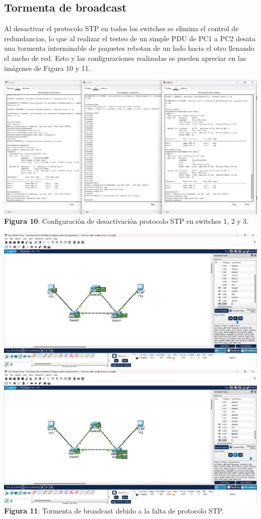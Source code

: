 \documentclass{article}
\begin{document}
    \subsection{Tormenta de broadcast}
    Al desactivar el protocolo STP en todos los switches se elimina el control de redundancias, lo que al realizar el testeo de un simple PDU de PC1 a PC2 desata una tormenta interminable de paquetes rebotan de un lado hacia el otro llenando el ancho de red. Esto y las configuraciones realizadas se pueden apreciar en las imágenes de Figura 10 y 11.
    \begin{center}
        \includegraphics[width=0.875\linewidth]{img_11} 
        \linebreak
        \small {\bfseries Figura 10}: Configuración de desactivación protocolo STP en switches 1, 2 y 3.
    \end{center}

    \begin{center}
        \includegraphics[width=0.475\linewidth]{img_13} 
        \includegraphics[width=0.475\linewidth]{img_14} 
        \linebreak
        \small {\bfseries Figura 11}: Tormenta de broadcast debido a la falta de protocolo STP.
    \end{center}
\end{document}
